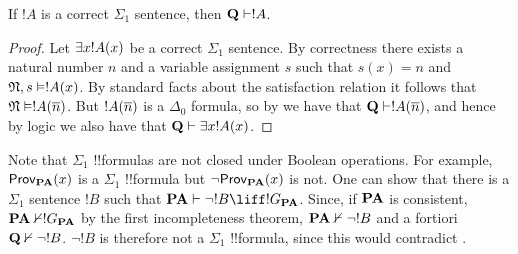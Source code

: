 \documentclass[../../../include/open-logic-section]{subfiles}
\begin{document}
\begin{thm}
If $!A$ is a correct $\Sigma_1$ sentence,
then $\Th{Q} \Proves !A$.
\end{thm}

\begin{proof}
Let $\lexists{x}!A(x)$ be a correct $\Sigma_1$ sentence.
By correctness there exists a natural number $n$ and a
variable assignment $s$ such that $s(x) = n$ and
$\Struct{N},s \Entails !A(x)$. By standard facts about
the satisfaction relation it follows that
$\Struct{N} \Entails !A(\num n)$. But $!A(\overline{n})$ is a
$\Delta_0$ formula, so by 
we have that $\Th{Q} \Proves !A(\num n)$, and hence by
logic we also have that $\Th{Q} \Proves \exists{x}!A(x)$.
\end{proof}

Note that $\Sigma_1$ !!{formula}s are not closed under Boolean
operations. For example, $\OProv[\Th{PA}](x)$ is a $\Sigma_1$
!!{formula} but $\lnot\OProv[\Th{PA}](x)$ is not. One can show that
there is a $\Sigma_1$ sentence $!B$ such that
$\Th{PA} \Proves \lnot!B \liff !G_\Th{PA}$.
Since, if $\mathbf{PA}$ is consistent, $\Th{PA} \Proves/ !G_\Th{PA}$
by the first incompleteness theorem, $\Th{PA} \Proves/ \lnot!B$ and
a fortiori $\Th{Q} \Proves/ \lnot!B$. $\lnot!B$ is therefore not a
$\Sigma_1$ !!{formula}, since this would contradict
.
\end{document}
